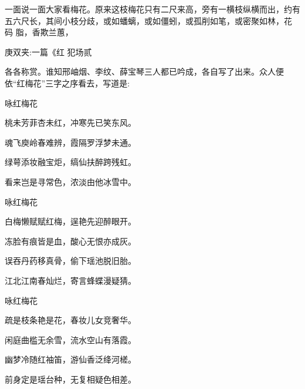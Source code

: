 \begin{parag}
    一面说一面大家看梅花。原来这枝梅花只有二尺来高，旁有一横枝纵横而出，约有五六尺长，其间小枝分歧，或如蟠螭，或如僵蚓，或孤削如笔，或密聚如林，花 码 脂，香欺兰蕙，\begin{note}庚双夹:一篇《红 犯场贰\end{note}各各称赏。谁知邢岫烟、李纹、薛宝琴三人都已吟成，各自写了出来。众人便依“红梅花”三字之序看去，写道是:
\end{parag}


\begin{poem}
    \begin{pl}咏红梅花\end{pl}

    \begin{pl}桃未芳菲杏未红，冲寒先已笑东风。\end{pl}

    \begin{pl}魂飞庾岭春难辨，霞隔罗浮梦未通。\end{pl}

    \begin{pl}绿萼添妆融宝炬，缟仙扶醉跨残虹。\end{pl}

    \begin{pl}看来岂是寻常色，浓淡由他冰雪中。\end{pl}
    \emptypl

    \begin{pl}咏红梅花\end{pl}

    \begin{pl}白梅懒赋赋红梅，逞艳先迎醉眼开。\end{pl}

    \begin{pl}冻脸有痕皆是血，酸心无恨亦成灰。\end{pl}

    \begin{pl}误吞丹药移真骨，偷下瑶池脱旧胎。\end{pl}

    \begin{pl}江北江南春灿烂，寄言蜂蝶漫疑猜。\end{pl}
    \emptypl

    \begin{pl}咏红梅花\end{pl}

    \begin{pl}疏是枝条艳是花，春妆儿女竞奢华。\end{pl}

    \begin{pl}闲庭曲槛无余雪，流水空山有落霞。\end{pl}

    \begin{pl}幽梦冷随红袖笛，游仙香泛绛河槎。\end{pl}

    \begin{pl}前身定是瑶台种，无复相疑色相差。\end{pl}
\end{poem}



